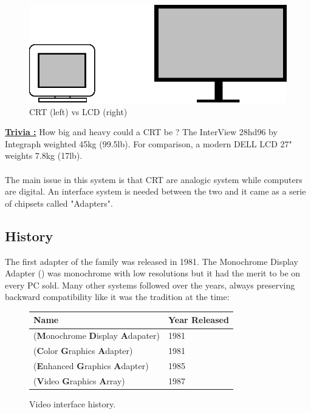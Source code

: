 \documentclass[book.tex]{subfiles}
\begin{document}
\begin{figure}[H]
\centering
\includegraphics[width=\textwidth]{imgs/crt_lcd.eps}
\caption{CRT (left) vs LCD (right)}
\label{fig:lcd_vs_crt}
\end{figure}

\textbf{\underline{Trivia :}} How big and heavy could a CRT be ? The InterView 28hd96 by Integraph weighted 45kg (99.5lb). For comparison, a modern DELL LCD 27" weights 7.8kg (17lb).\\
\\
The main issue in this system is that CRT are analogic system while computers are digital. An interface system is needed between the two and it came as a serie of chipsets called "Adapters".

  \subsection{History}

The first adapter of the family was released in 1981. The Monochrome Display
   Adapter () was monochrome with low resolutions but it had the merit to be on every PC sold. Many other systems followed over the years, always preserving backward compatibility like it was the tradition at the time:
\bigskip
  
 \begin{figure}[H]
\centering  
\begin{tabularx}{\textwidth}{ X  Y }
  \toprule
  \textbf{Name} &  \textbf{Year Released} \\
  \toprule {}
   (\textbf{M}onochrome
   \textbf{D}isplay
   \textbf{A}dapater) & 1981 
   \\ 
   (\textbf{C}olor
   \textbf{G}raphics
   \textbf{A}dapter) & 1981 
    \\ 
   (\textbf{E}nhanced
   \textbf{G}raphics
   \textbf{A}dapter) & 1985
   \\ 
   (\textbf{V}ideo
   \textbf{G}raphics
   \textbf{A}rray)  & 1987
    \\
  \toprule
\end{tabularx}
\caption{Video interface history.}\label{fig:vga_history}
\end{figure}
\end{document}
